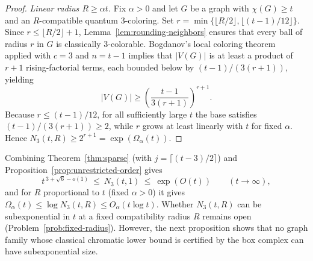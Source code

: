 \begin{proof}
\emph{Linear radius $R\ge\alpha t$.} Fix $\alpha>0$ and let $G$ be a graph with $\chi(G)\ge t$ and an $R$-compatible quantum $3$-coloring. Set $r=\min\{\lfloor R/2\rfloor,\lfloor(t-1)/12\rfloor\}$. Since $r\le\lfloor R/2\rfloor+1$, Lemma~\ref{lem:rounding-neighbors} ensures that every ball of radius $r$ in $G$ is classically $3$-colorable. Bogdanov's local coloring theorem~\cite[Theorem~1.1]{BogOrder} applied with $c=3$ and $n=t-1$ implies that $|V(G)|$ is at least a product of $r+1$ rising-factorial terms, each bounded below by $(t-1)/(3(r+1))$, yielding
\[
 |V(G)|\ge \left(\frac{t-1}{3(r+1)}\right)^{r+1}.
\]
Because $r\le(t-1)/12$, for all sufficiently large $t$ the base satisfies $(t-1)/(3(r+1))\ge2$, while $r$ grows at least linearly with $t$ for fixed $\alpha$. Hence $N_3(t,R)\ge 2^{r+1}=\exp(\Omega_\alpha(t))$.
\end{proof}

Combining Theorem~\ref{thm:sparse} (with $j=\lceil(t-3)/2\rceil$) and Proposition~\ref{prop:unrestricted-order} gives
\[
 t^{\,3+\sqrt6-o(1)}\ \le\ N_3(t,1)\ \le\ \exp(O(t))\qquad (t\to\infty),
\]
and for $R$ proportional to $t$ (fixed $\alpha>0$) it gives $\Omega_\alpha(t)\le\log N_3(t,R)\le O_\alpha(t\log t)$. Whether $N_3(t,R)$ can be subexponential in $t$ at a fixed compatibility radius $R$ remains open (Problem~\ref{prob:fixed-radius}). However, the next proposition shows that no graph family whose classical chromatic lower bound is certified by the box complex can have subexponential size.

